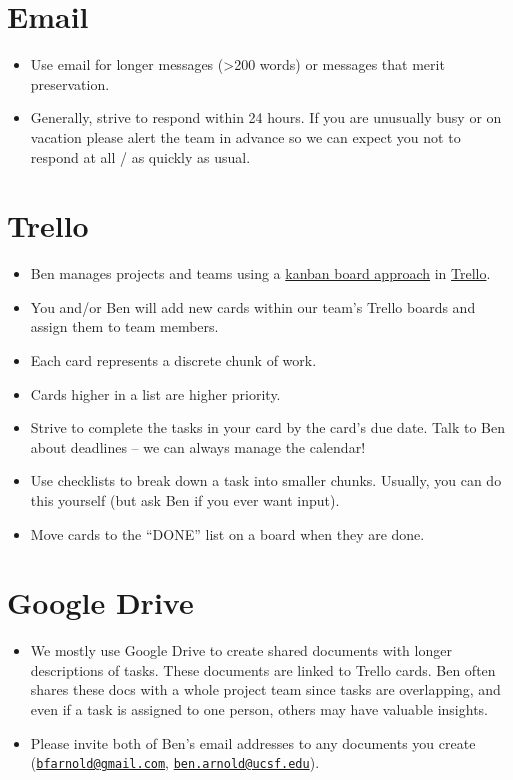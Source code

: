 \documentclass[]{book}
\providecommand{\tightlist}{%
  \setlength{\itemsep}{0pt}\setlength{\parskip}{0pt}}
\begin{document}
\hypertarget{email}{%
\section{Email}\label{email}}

\begin{itemize}
\tightlist
\item
  Use email for longer messages (\textgreater200 words) or messages that merit preservation.
\item
  Generally, strive to respond within 24 hours. If you are unusually busy or on vacation please alert the team in advance so we can expect you not to respond at all / as quickly as usual.
\end{itemize}

\hypertarget{trello}{%
\section{Trello}\label{trello}}

\begin{itemize}
\tightlist
\item
  Ben manages projects and teams using a \href{https://www.atlassian.com/agile/kanban/boards}{kanban board approach} in \href{https://www.trello.com}{Trello}.
\item
  You and/or Ben will add new cards within our team's Trello boards and assign them to team members.
\item
  Each card represents a discrete chunk of work.
\item
  Cards higher in a list are higher priority.
\item
  Strive to complete the tasks in your card by the card's due date. Talk to Ben about deadlines -- we can always manage the calendar!
\item
  Use checklists to break down a task into smaller chunks. Usually, you can do this yourself (but ask Ben if you ever want input).
\item
  Move cards to the ``DONE'' list on a board when they are done.
\end{itemize}

\hypertarget{google-drive}{%
\section{Google Drive}\label{google-drive}}

\begin{itemize}
\tightlist
\item
  We mostly use Google Drive to create shared documents with longer descriptions of tasks. These documents are linked to Trello cards. Ben often shares these docs with a whole project team since tasks are overlapping, and even if a task is assigned to one person, others may have valuable insights.
\item
  Please invite both of Ben's email addresses to any documents you create (\href{mailto:bfarnold@gmail.com}{\nolinkurl{bfarnold@gmail.com}}, \href{mailto:ben.arnold@ucsf.edu}{\nolinkurl{ben.arnold@ucsf.edu}}).
\end{itemize}
\end{document}
